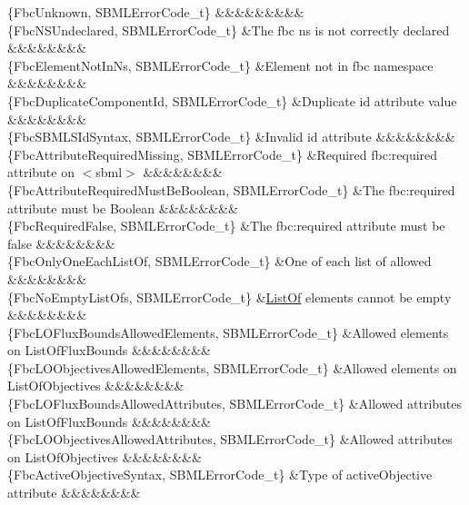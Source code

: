 \begin{DoxyParagraph}{}
\begin{longtabu}
\{Fbc\+Unknown, S\+B\+M\+L\+Error\+Code\+\_\+t\} &&&&&&&&&\\
\{Fbc\+N\+S\+Undeclared, S\+B\+M\+L\+Error\+Code\+\_\+t\} &The fbc ns is not correctly declared &&&&&&&&\\
\{Fbc\+Element\+Not\+In\+Ns, S\+B\+M\+L\+Error\+Code\+\_\+t\} &Element not in fbc namespace &&&&&&&&\\
\{Fbc\+Duplicate\+Component\+Id, S\+B\+M\+L\+Error\+Code\+\_\+t\} &Duplicate \textquotesingle{}id\textquotesingle{} attribute value &&&&&&&&\\
\{Fbc\+S\+B\+M\+L\+S\+Id\+Syntax, S\+B\+M\+L\+Error\+Code\+\_\+t\} &Invalid \textquotesingle{}id\textquotesingle{} attribute &&&&&&&&\\
\{Fbc\+Attribute\+Required\+Missing, S\+B\+M\+L\+Error\+Code\+\_\+t\} &Required fbc\+:required attribute on {\ttfamily $<$sbml$>$} &&&&&&&&\\
\{Fbc\+Attribute\+Required\+Must\+Be\+Boolean, S\+B\+M\+L\+Error\+Code\+\_\+t\} &The fbc\+:required attribute must be Boolean &&&&&&&&\\
\{Fbc\+Required\+False, S\+B\+M\+L\+Error\+Code\+\_\+t\} &The fbc\+:required attribute must be \textquotesingle{}false\textquotesingle{} &&&&&&&&\\
\{Fbc\+Only\+One\+Each\+List\+Of, S\+B\+M\+L\+Error\+Code\+\_\+t\} &One of each list of allowed &&&&&&&&\\
\{Fbc\+No\+Empty\+List\+Ofs, S\+B\+M\+L\+Error\+Code\+\_\+t\} &\hyperlink{class_list_of}{List\+Of} elements cannot be empty &&&&&&&&\\
\{Fbc\+L\+O\+Flux\+Bounds\+Allowed\+Elements, S\+B\+M\+L\+Error\+Code\+\_\+t\} &Allowed elements on List\+Of\+Flux\+Bounds &&&&&&&&\\
\{Fbc\+L\+O\+Objectives\+Allowed\+Elements, S\+B\+M\+L\+Error\+Code\+\_\+t\} &Allowed elements on List\+Of\+Objectives &&&&&&&&\\
\{Fbc\+L\+O\+Flux\+Bounds\+Allowed\+Attributes, S\+B\+M\+L\+Error\+Code\+\_\+t\} &Allowed attributes on List\+Of\+Flux\+Bounds &&&&&&&&\\
\{Fbc\+L\+O\+Objectives\+Allowed\+Attributes, S\+B\+M\+L\+Error\+Code\+\_\+t\} &Allowed attributes on List\+Of\+Objectives &&&&&&&&\\
\{Fbc\+Active\+Objective\+Syntax, S\+B\+M\+L\+Error\+Code\+\_\+t\} &Type of active\+Objective attribute &&&&&&&&\\

\end{longtabu}
\end{DoxyParagraph}
